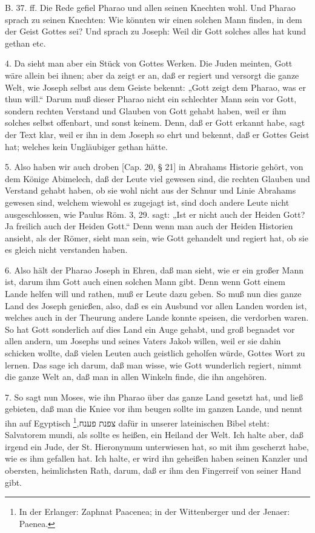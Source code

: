 B. 37. ff. Die Rede gefiel Pharao und allen seinen Knechten wohl. Und Pharao sprach zu seinen Knechten: Wie könnten wir einen solchen Mann finden, in dem der Geist Gottes sei? Und sprach zu Joseph: Weil dir Gott solches alles hat kund gethan etc.

4. Da sieht man aber ein Stück von Gottes Werken. Die Juden meinten, Gott wäre allein bei ihnen; aber da zeigt er an, daß er regiert und versorgt die ganze Welt, wie Joseph selbst aus dem Geiste bekennt: „Gott zeigt dem Pharao, was er thun will.“ Darum muß dieser Pharao nicht ein schlechter Mann sein vor Gott, sondern rechten Verstand und Glauben von Gott gehabt haben, weil er ihm solches selbst offenbart, und sonst keinem. Denn, daß er Gott erkannt habe, sagt der Text klar, weil er ihn in dem Joseph so ehrt und bekennt, daß er Gottes Geist hat; welches kein Ungläubiger gethan hätte.

5. Also haben wir auch droben [Cap. 20, § 21] in Abrahams Historie gehört, von dem Könige Abimelech, daß der Leute viel gewesen sind, die rechten Glauben und Verstand gehabt haben, ob sie wohl nicht aus der Schnur und Linie Abrahams gewesen sind, welchem wiewohl es zugejagt ist, sind doch andere Leute nicht ausgeschlossen, wie Paulus Röm. 3, 29. sagt: „Ist er nicht auch der Heiden Gott? Ja freilich auch der Heiden Gott.“ Denn wenn man auch der Heiden Historien ansieht, als der Römer, sieht man sein, wie Gott gehandelt und regiert hat, ob sie es gleich nicht verstanden haben.

6. Also hält der Pharao Joseph in Ehren, daß man sieht, wie er ein großer Mann ist, darum ihm Gott auch einen solchen Mann gibt. Denn wenn Gott einem Lande helfen will und rathen, muß er Leute dazu geben. So muß nun dies ganze Land des Joseph genießen, also, daß es ein Ausbund vor allen Landen worden ist, welches auch in der Theurung andere Lande konnte speisen, die verdorben waren. So hat Gott sonderlich auf dies Land ein Auge gehabt, und groß begnadet vor allen andern, um Josephs und seines Vaters Jakob willen, weil er sie dahin schicken wollte, daß vielen Leuten auch geistlich geholfen würde, Gottes Wort zu lernen. Das sage ich darum, daß man wisse, wie Gott wunderlich regiert, nimmt die ganze Welt an, daß man in allen Winkeln finde, die ihn angehören.

7. So sagt nun Moses, wie ihn Pharao über das ganze Land gesetzt hat, und ließ gebieten, daß man die Kniee vor ihm beugen sollte im ganzen Lande, und nennt ihn auf Egyptisch צפנת פענח,\footnote{In der Erlanger: Zaphnat Paacenea; in der Wittenberger und der Jenaer: Paenea.} dafür in unserer lateinischen Bibel steht: Salvatorem mundi, als sollte es heißen, ein Heiland der Welt. Ich halte aber, daß irgend ein Jude, der St. Hieronymum unterwiesen hat, so mit ihm gescherzt habe, wie es ihm gefallen hat. Ich halte, er wird ihn geheißen haben seinen Kanzler und obersten, heimlichsten Rath, darum, daß er ihm den Fingerreif von seiner Hand gibt.

